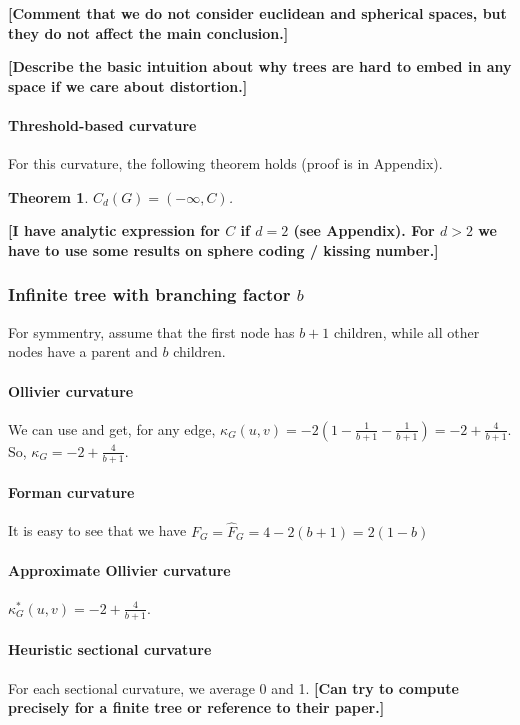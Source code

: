\documentclass{article} %
\newtheorem{theorem}{Theorem}[section]
\begin{document}
\textbf{[Comment that we do not consider euclidean and spherical spaces, but they do not affect the main conclusion.]}

\textbf{[Describe the basic intuition about why trees are hard to embed in any space if we care about distortion.]}

\paragraph{Threshold-based curvature} 
For this curvature, the following theorem holds (proof is in Appendix).

\begin{theorem}\label{thm:star_threshold}
$C_d(G) = (-\infty, C)$.
\end{theorem}

\textbf{[I have analytic expression for $C$ if $d = 2$ (see Appendix). For $d > 2$ we have to use some results on sphere coding / kissing number.]}

\subsubsection{Infinite tree with branching factor $b$}

For symmentry, assume that the first node has $b+1$ children, while all other nodes have a parent and $b$ children.

\paragraph{Ollivier curvature} We can use  and get, for any edge,
$\kappa_G(u,v) = -2 \left(1 - \frac{1}{b+1} - \frac{1}{b+1} \right) = - 2 + \frac{4}{b+1}$. So, $\kappa_G = -2 + \frac{4}{b+1}$.

\paragraph{Forman curvature} 
It is easy to see that we have 
$F_G = \hat F_G = 4 - 2(b+1) = 2(1-b)$


\paragraph{Approximate Ollivier curvature} 
$\kappa_G^\ast(u,v) = -2 + \frac{4}{b+1}$.

\paragraph{Heuristic sectional curvature} For each sectional curvature, we average 0 and 1. \textbf{[Can try to compute precisely for a finite tree or reference to their paper.]}
\end{document}
